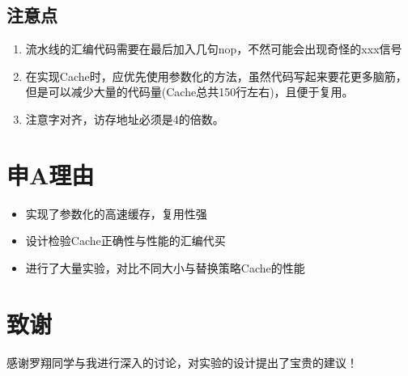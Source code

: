 \documentclass[12pt]{article} %
\begin{document}
\begin{sloppypar}
\subsection{注意点}
\begin{enumerate}
\item 流水线的汇编代码需要在最后加入几句nop，不然可能会出现奇怪的xxx信号
\item 在实现Cache时，应优先使用参数化的方法，虽然代码写起来要花更多脑筋，但是可以减少大量的代码量(Cache总共150行左右)，且便于复用。
\item 注意字对齐，访存地址必须是4的倍数。
\end{enumerate}

\section{申A理由}

\begin{itemize}
\item 实现了参数化的高速缓存，复用性强
\item 设计检验Cache正确性与性能的汇编代买
\item 进行了大量实验，对比不同大小与替换策略Cache的性能
\end{itemize}

\section{致谢}

感谢罗翔同学与我进行深入的讨论，对实验的设计提出了宝贵的建议！

\end{sloppypar}
\end{document}
